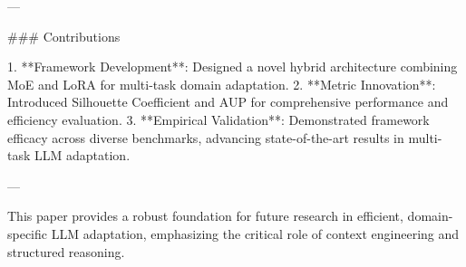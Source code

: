 ---

### Contributions  

1. **Framework Development**: Designed a novel hybrid architecture combining MoE and LoRA for multi-task domain adaptation.  
2. **Metric Innovation**: Introduced Silhouette Coefficient and AUP for comprehensive performance and efficiency evaluation.  
3. **Empirical Validation**: Demonstrated framework efficacy across diverse benchmarks, advancing state-of-the-art results in multi-task LLM adaptation.  

--- 

This paper provides a robust foundation for future research in efficient, domain-specific LLM adaptation, emphasizing the critical role of context engineering and structured reasoning.